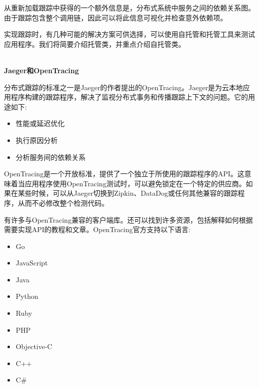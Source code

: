 从重新加载跟踪中获得的一个额外信息是，分布式系统中服务之间的依赖关系图。由于跟踪包含整个调用链，因此可以将此信息可视化并检查意外依赖项。


实现跟踪时，有几种可能的解决方案可供选择，可以使用自托管和托管工具来测试应用程序。我们将简要介绍托管类，并重点介绍自托管类。

\hspace*{\fill} \\ %
\noindent
\textbf{Jaeger和OpenTracing}

分布式跟踪的标准之一是Jaeger的作者提出的OpenTracing。Jaeger是为云本地应用程序构建的跟踪程序，解决了监视分布式事务和传播跟踪上下文的问题。它的用途如下:

\begin{itemize}
\item 
性能或延迟优化

\item 
执行原因分析

\item 
分析服务间的依赖关系
\end{itemize}

OpenTracing是一个开放标准，提供了一个独立于所使用的跟踪程序的API。这意味着当应用程序使用OpenTracing测试时，可以避免锁定在一个特定的供应商。如果在某些时候，可以从Jaeger切换到Zipkin、DataDog或任何其他兼容的跟踪程序，从而不必修改整个检测代码。

有许多与OpenTracing兼容的客户端库。还可以找到许多资源，包括解释如何根据需要实现API的教程和文章。OpenTracing官方支持以下语言:

\begin{itemize}
\item 
Go

\item 
JavaScript

\item 
Java

\item 
Python

\item 
Ruby

\item 
PHP

\item 
Objective-C

\item 
C++

\item 
C\#
\end{itemize}

